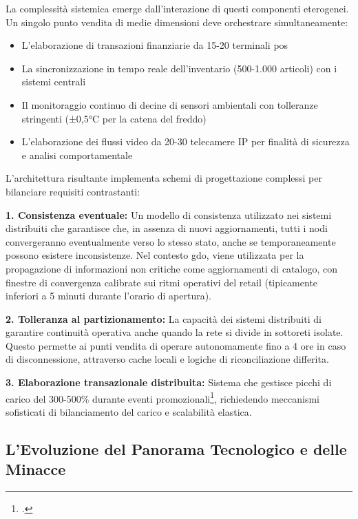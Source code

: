 La complessità sistemica emerge dall'interazione di questi componenti eterogenei. Un singolo punto vendita di medie dimensioni deve orchestrare simultaneamente:
\begin{itemize}
\item L'elaborazione di transazioni finanziarie da 15-20 terminali \gls{pos}
\item La sincronizzazione in tempo reale dell'inventario (500-1.000 articoli) con i sistemi centrali
\item Il monitoraggio continuo di decine di sensori ambientali con tolleranze stringenti (±0,5°C per la catena del freddo)
\item L'elaborazione dei flussi video da 20-30 telecamere IP per finalità di sicurezza e analisi comportamentale
\end{itemize}

L'architettura risultante implementa schemi di progettazione complessi per bilanciare requisiti contrastanti:

\textbf{1. Consistenza eventuale:} Un modello di consistenza utilizzato nei sistemi distribuiti che garantisce che, in assenza di nuovi aggiornamenti, tutti i nodi convergeranno eventualmente verso lo stesso stato, anche se temporaneamente possono esistere inconsistenze. Nel contesto \gls{gdo}, viene utilizzata per la propagazione di informazioni non critiche come aggiornamenti di catalogo, con finestre di convergenza calibrate sui ritmi operativi del retail (tipicamente inferiori a 5 minuti durante l'orario di apertura).

\textbf{2. Tolleranza al partizionamento:} La capacità dei sistemi distribuiti di garantire continuità operativa anche quando la rete si divide in sottoreti isolate. Questo permette ai punti vendita di operare autonomamente fino a 4 ore in caso di disconnessione, attraverso cache locali e logiche di riconciliazione differita.

\textbf{3. Elaborazione transazionale distribuita:} Sistema che gestisce picchi di carico del 300-500\% durante eventi promozionali\footcite{Osservatorio2024}, richiedendo meccanismi sofisticati di bilanciamento del carico e scalabilità elastica.

\subsection{\texorpdfstring{\textbf{L'Evoluzione del Panorama Tecnologico e delle Minacce}}{1.1.2 - L'Evoluzione del Panorama Tecnologico e delle Minacce}}
\label{subsec:evoluzione_tecnologica}

